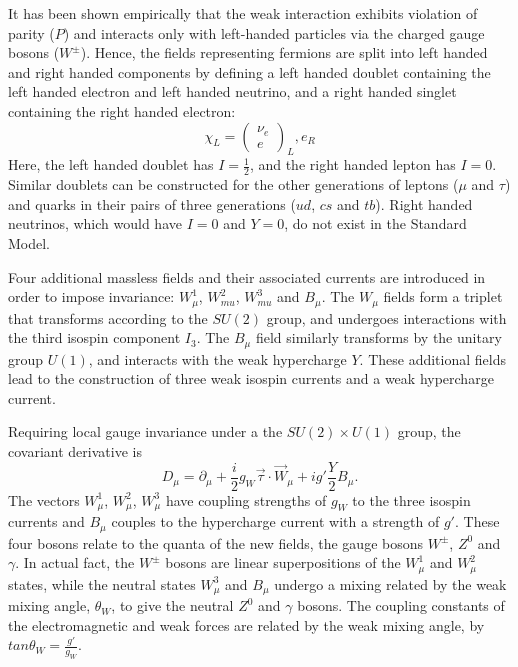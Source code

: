 It has been shown empirically that the weak interaction exhibits violation of parity ($P$) and interacts
only with left-handed particles via the charged gauge bosons ($W^{\pm}$). Hence, the fields representing
fermions are split into left handed and right handed components by defining a left handed doublet
containing the left handed electron and left handed neutrino, and a right handed singlet containing the right
handed electron:
\begin{equation}
\chi_{L} = \left( \begin{array}{c} \nu_{e} \\ e \end{array}\right)_{L}, e_{R}
\end{equation}
Here, the left handed doublet has $I=\frac{1}{2}$, and the right handed lepton has $I = 0$. Similar doublets
can be constructed for the other generations of leptons ($\mu$ and $\tau$) and quarks in their pairs of three
generations ($ud$, $cs$ and $tb$). Right handed neutrinos, which would have $I=0$ and $Y=0$, do not exist in
the Standard Model. %

Four additional massless fields and their associated currents are introduced in order to impose invariance:
$W_{\mu}^{1}$, $W_{mu}^{2}$, $W_{mu}^{3}$ and $B_{\mu}$. The $W_{\mu}$ fields form a triplet that transforms
according to the $SU(2)$ group, and undergoes interactions with the third isospin component $I_{3}$. The
$B_{\mu}$ field similarly transforms by the unitary group $U(1)$, and interacts with the weak hypercharge $Y$.
These additional fields lead to the construction of three weak isospin currents and a weak hypercharge
current.

Requiring local gauge invariance under a the $SU(2) \times U(1)$ group, the covariant derivative is
\begin{equation}
D_{\mu} = \partial_{\mu} + \frac{i}{2} g_{W} \vec{\tau} \cdot \vec{W}_{\mu} + ig' \frac{Y}{2}B_{\mu}.
\end{equation}
The vectors $W_{\mu}^{1}$, $W_{\mu}^{2}$, $W_{\mu}^{3}$ have coupling strengths of $g_{W}$ to the three
isospin currents and $B_{\mu}$ couples to the hypercharge current with a strength of $g'$. These four bosons
relate to the quanta of the new fields, \ie the gauge bosons $W^{\pm}$, $Z^{0}$ and $\gamma$. In actual fact,
the $W^{\pm}$ bosons are linear superpositions of the $W_{\mu}^{1}$ and $W_{\mu}^{2}$ states, while the
neutral states $W_{\mu}^{3}$ and $B_{\mu}$ undergo a mixing related by the weak mixing angle, $\theta_{W}$, to
give the neutral $Z^{0}$ and $\gamma$ bosons. The coupling constants of the electromagnetic and weak forces
are related by the weak mixing angle, by $tan \theta_{W} = \frac{g'}{g_{W}}$.

